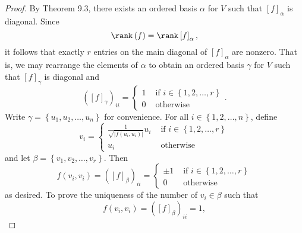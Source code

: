 \documentclass[linearalgebra]{subfiles}
\begin{document}
    \begin{proof}
        By Theorem 9.3, there exists an ordered basis $\alpha$ for $V$ such that $\left[ f \right] _\alpha$ is diagonal. Since
        \begin{equation*}
            \rank\left( f \right) = \rank\left[ f \right] _\alpha,
        \end{equation*}
        it follows that exactly $r$ entries on the main diagonal of $\left[ f \right] _\alpha$ are nonzero. That is, we may rearrange the elements of $\alpha$ to obtain an ordered basis $\gamma$ for $V$ such that $\left[ f \right] _\gamma$ is diagonal and
        \begin{equation*}
            \left( \left[ f \right] _\gamma \right)_{ii} =
            \begin{cases} 
                1 & \text{ if } i\in \left\lbrace 1,2,\ldots,r \right\rbrace \\ 
                0 & \text{ otherwise }
            \end{cases}.
        \end{equation*}
        Write $\gamma=\left\lbrace u_1,u_2,\ldots,u_n \right\rbrace$ for convenience. For all $i\in\left\lbrace 1,2,\ldots,n \right\rbrace$, define
        \begin{equation*}
            v_i =
            \begin{cases} 
                \frac{1}{\sqrt{\left|f\left( u_i,u_i \right)\right| }}u_i & \text{ if } i\in\left\lbrace 1,2,\ldots,r \right\rbrace \\ 
                u_i & \text{ otherwise }
            \end{cases}
        \end{equation*}
        and let $\beta=\left\lbrace v_1,v_2,\ldots,v_r \right\rbrace$. Then
        \begin{equation*}
            f\left( v_i,v_i \right) = \left( \left[ f \right] _\beta \right) _{ii} = 
            \begin{cases} 
                \pm 1 & \text{ if } i\in\left\lbrace 1,2,\ldots,r \right\rbrace \\ 
                0 & \text{ otherwise }
            \end{cases}
        \end{equation*}
        as desired. To prove the uniqueness of the number of $v_i\in\beta$ such that
        \begin{equation*}
            f\left( v_i,v_i \right) = \left( \left[ f \right] _\beta \right) _{ii} = 1,
        \end{equation*}

\end{proof}
\end{document}
